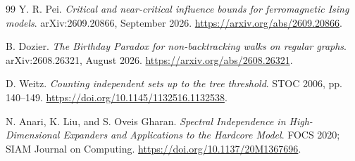 \documentclass[11pt]{article}
\theoremstyle{definition}
\begin{document}
\begin{thebibliography}{99}
Y. R. Pei.
\emph{Critical and near-critical influence bounds for ferromagnetic Ising models}.
arXiv:2609.20866, September 2026.
\url{https://arxiv.org/abs/2609.20866}.

B. Dozier.
\emph{The Birthday Paradox for non-backtracking walks on regular graphs}.
arXiv:2608.26321, August 2026.
\url{https://arxiv.org/abs/2608.26321}.

D. Weitz.
\emph{Counting independent sets up to the tree threshold}.
STOC 2006, pp. 140--149.
\url{https://doi.org/10.1145/1132516.1132538}.

N. Anari, K. Liu, and S. Oveis Gharan.
\emph{Spectral Independence in High-Dimensional Expanders and
Applications to the Hardcore Model}.
FOCS 2020; SIAM Journal on Computing.
\url{https://doi.org/10.1137/20M1367696}.
\end{thebibliography}
\endgroup
\end{document}
